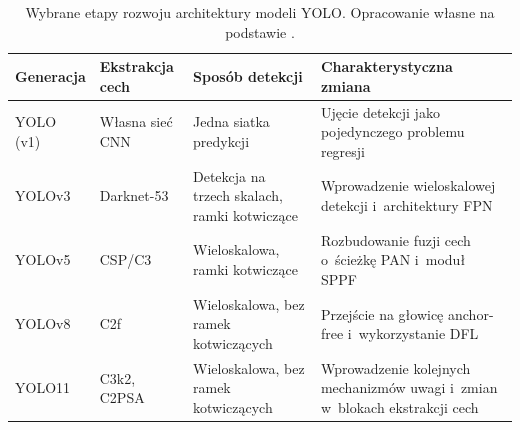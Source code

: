 \begin{table}[h!] %
    \centering
    \small
    \renewcommand{\arraystretch}{1.2}
    \caption{Wybrane etapy rozwoju architektury modeli YOLO.
        Opracowanie własne na podstawie
        \cite{bib:redmon2016lookonceunifiedrealtime,
            bib:redmon2018yolov3incrementalimprovement,
            bib:ultralytics_yolo_architecture,
            bib:jocher2026ultralyticsyolo26}.
    }
    \label{tab:porownanie_wersji_YOLO}
    \begin{tabularx}{\textwidth}{
        >{\raggedright\arraybackslash}p{2.5cm}
        >{\raggedright\arraybackslash}X
        >{\raggedright\arraybackslash}X
        >{\raggedright\arraybackslash}X
        }

        \toprule

        \textbf{Generacja}                           &
        \textbf{Ekstrakcja cech}                     &
        \textbf{Sposób detekcji}                     &
        \textbf{Charakterystyczna zmiana}                                          \\

        \midrule

        YOLO (v1)                                    &
        Własna sieć CNN                              &
        Jedna siatka predykcji                       &
        Ujęcie detekcji jako pojedynczego problemu regresji                        \\

        YOLOv3                                       &
        Darknet-53                                   &
        Detekcja na trzech skalach, ramki kotwiczące &
        Wprowadzenie wieloskalowej detekcji i~architektury FPN                     \\

        YOLOv5                                       &
        CSP/C3                                       &
        Wieloskalowa, ramki kotwiczące               &
        Rozbudowanie fuzji cech o~ścieżkę PAN i~moduł SPPF                         \\

        YOLOv8                                       &
        C2f                                          &
        Wieloskalowa, bez ramek kotwiczących         &
        Przejście na głowicę anchor-free i~wykorzystanie DFL                       \\

        YOLO11                                       &
        C3k2, C2PSA                                  &
        Wieloskalowa, bez ramek kotwiczących         &
        Wprowadzenie kolejnych mechanizmów uwagi i~zmian w~blokach ekstrakcji cech \\


\end{tabularx}
\end{table}
